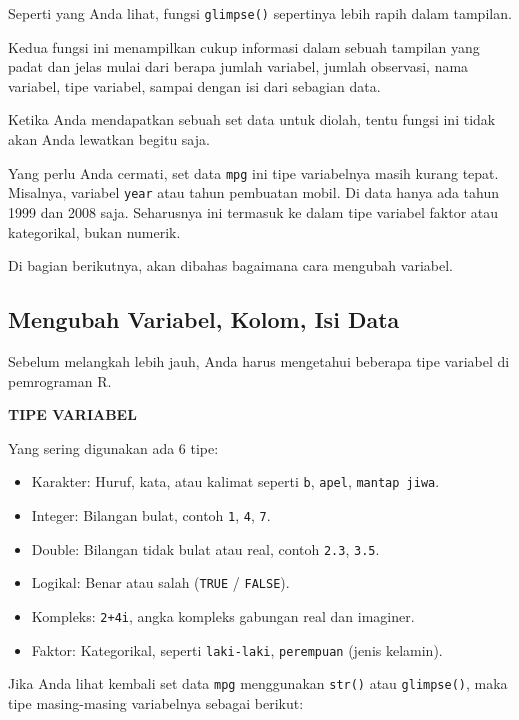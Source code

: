 \documentclass[openany]{book}
\providecommand{\tightlist}{%
  \setlength{\itemsep}{0pt}\setlength{\parskip}{0pt}}
\begin{document}
Seperti yang Anda lihat, fungsi \texttt{glimpse()} sepertinya lebih
rapih dalam tampilan.

Kedua fungsi ini menampilkan cukup informasi dalam sebuah tampilan yang
padat dan jelas mulai dari berapa jumlah variabel, jumlah observasi,
nama variabel, tipe variabel, sampai dengan isi dari sebagian data.

Ketika Anda mendapatkan sebuah set data untuk diolah, tentu fungsi ini
tidak akan Anda lewatkan begitu saja.

Yang perlu Anda cermati, set data \texttt{mpg} ini tipe variabelnya
masih kurang tepat. Misalnya, variabel \texttt{year} atau tahun
pembuatan mobil. Di data hanya ada tahun 1999 dan 2008 saja. Seharusnya
ini termasuk ke dalam tipe variabel faktor atau kategorikal, bukan
numerik.

Di bagian berikutnya, akan dibahas bagaimana cara mengubah variabel.

\subsection{Mengubah Variabel, Kolom, Isi
Data}\label{mengubah-variabel-kolom-isi-data}

Sebelum melangkah lebih jauh, Anda harus mengetahui beberapa tipe
variabel di pemrograman R.

\textbf{TIPE VARIABEL}

Yang sering digunakan ada 6 tipe:

\begin{itemize}
\tightlist
\item
  Karakter: Huruf, kata, atau kalimat seperti \texttt{b}, \texttt{apel},
  \texttt{mantap\ jiwa}.
\item
  Integer: Bilangan bulat, contoh \texttt{1}, \texttt{4}, \texttt{7}.
\item
  Double: Bilangan tidak bulat atau real, contoh \texttt{2.3},
  \texttt{3.5}.
\item
  Logikal: Benar atau salah (\texttt{TRUE} / \texttt{FALSE}).
\item
  Kompleks: \texttt{2+4i}, angka kompleks gabungan real dan imaginer.
\item
  Faktor: Kategorikal, seperti \texttt{laki-laki}, \texttt{perempuan}
  (jenis kelamin).
\end{itemize}

Jika Anda lihat kembali set data \texttt{mpg} menggunakan \texttt{str()}
atau \texttt{glimpse()}, maka tipe masing-masing variabelnya sebagai
berikut:
\end{document}
